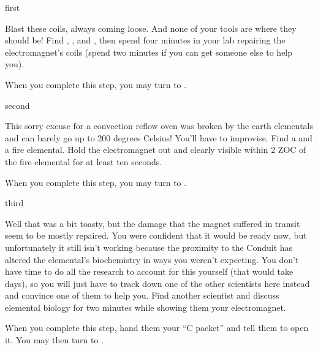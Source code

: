 \documentclass[notebook]{elementals}
\begin{document}

\startnotebook{\nElectromagnet{}}

\begin{page}{first}

Blast these coils, always coming loose. And none of your tools are where they should be! Find \iTungsten{}, \iWireTightener{}, and \iWireStripper{}, then spend four minutes in your lab repairing the electromagnet's coils (spend two minutes if you can get someone else to help you).

When you complete this step, you may turn to .

\end{page}

\begin{page}{second}

This sorry excuse for a convection reflow oven was broken by the earth elementals and can barely go up to 200 degrees Celsius! You'll have to improvise. Find a \iSiliconeMitt{} and a fire elemental. Hold the electromagnet out and clearly visible within 2 ZOC of the fire elemental for at least ten seconds.

When you complete this step, you may turn to .

\end{page}

\begin{page}{third}

Well that was a bit toasty, but the damage that the magnet suffered in transit seem to be mostly repaired. You were confident that it would be ready now, but unfortunately it still isn't working because the proximity to the Conduit has altered the elemental's biochemistry in ways you weren't expecting. You don't have time to do all the research to account for this yourself (that would take days), so you will just have to track down one of the other scientists here instead and convince one of them to help you. Find another scientist and discuss elemental biology for two minutes while showing them your electromagnet.

When you complete this step, hand them your ``C packet'' and tell them to open it. You may then turn to .

\end{page}
\end{document}
